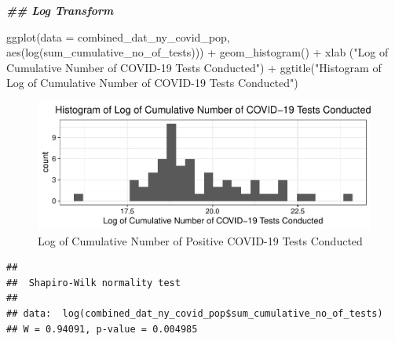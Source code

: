 \documentclass[
  12pt,
]{article}
\newenvironment{Shaded}{\begin{snugshade}}{\end{snugshade}}
\newcommand{\AttributeTok}[1]{\textcolor[rgb]{0.77,0.63,0.00}{#1}}
\newcommand{\CommentTok}[1]{\textcolor[rgb]{0.56,0.35,0.01}{\textit{#1}}}
\newcommand{\DocumentationTok}[1]{\textcolor[rgb]{0.56,0.35,0.01}{\textbf{\textit{#1}}}}
\newcommand{\FunctionTok}[1]{\textcolor[rgb]{0.00,0.00,0.00}{#1}}
\newcommand{\NormalTok}[1]{#1}
\newcommand{\SpecialCharTok}[1]{\textcolor[rgb]{0.00,0.00,0.00}{#1}}
\newcommand{\StringTok}[1]{\textcolor[rgb]{0.31,0.60,0.02}{#1}}
\begin{document}
\begin{Shaded}
\begin{Highlighting}[]
\DocumentationTok{\#\# Log Transform}

\FunctionTok{ggplot}\NormalTok{(}\AttributeTok{data =}\NormalTok{ combined\_dat\_ny\_covid\_pop, }\FunctionTok{aes}\NormalTok{(}\FunctionTok{log}\NormalTok{(sum\_cumulative\_no\_of\_tests))) }\SpecialCharTok{+}
  \FunctionTok{geom\_histogram}\NormalTok{() }\SpecialCharTok{+}
  \FunctionTok{xlab}\NormalTok{ (}\StringTok{"Log of Cumulative Number of COVID{-}19 Tests Conducted"}\NormalTok{) }\SpecialCharTok{+}
  \FunctionTok{ggtitle}\NormalTok{(}\StringTok{"Histogram of Log of Cumulative Number of COVID{-}19 Tests Conducted"}\NormalTok{)}
\end{Highlighting}
\end{Shaded}

\begin{figure}

\includegraphics{EDA_Final_Group_Project_files/figure-latex/unnamed-chunk-7-1} \hfill{}

\caption{Log of Cumulative Number of Positive COVID-19 Tests Conducted}\label{fig:unnamed-chunk-7}
\end{figure}

\begin{Shaded}
\end{Shaded}

\begin{verbatim}
## 
##  Shapiro-Wilk normality test
## 
## data:  log(combined_dat_ny_covid_pop$sum_cumulative_no_of_tests)
## W = 0.94091, p-value = 0.004985
\end{verbatim}
\end{document}
